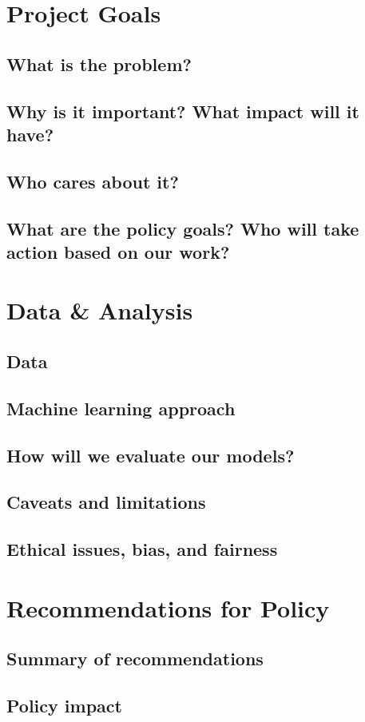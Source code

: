 \section{Project Goals}
\subsection{What is the problem?}
\subsection{Why is it important? What impact will it have?}
\subsection{Who cares about it?}
\subsection{What are the policy goals? Who will take action based on our work?}

\section{Data \& Analysis}
\subsection{Data}
\subsection{Machine learning approach}
\subsection{How will we evaluate our models?}
\subsection{Caveats and limitations}
\subsection{Ethical issues, bias, and fairness}

\section{Recommendations for Policy}
\subsection{Summary of recommendations}
\subsection{Policy impact}
